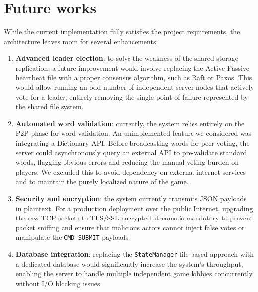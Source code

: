 \documentclass{scrartcl}
\begin{document}
\section{Future works}\label{future-works}
While the current implementation fully satisfies the project requirements, the architecture leaves room for several enhancements:
\begin{enumerate}
  \item \textbf{Advanced leader election}:
  to solve the weakness of the shared-storage replication, a future improvement would involve replacing the Active-Passive heartbeat file with a proper
  consensus algorithm, such as Raft or Paxos. This would allow running an odd number of independent server nodes that actively vote for a leader,
  entirely removing the single point of failure represented by the shared file system.
  \item \textbf{Automated word validation}:
  currently, the system relies entirely on the P2P phase for word validation. An unimplemented feature we considered was integrating a Dictionary API.
  Before broadcasting words for peer voting, the server could asynchronously query an external API to pre-validate standard words, flagging obvious errors and
  reducing the manual voting burden on players. We excluded this to avoid dependency on external internet services and to maintain the purely localized nature of the game.
  \item \textbf{Security and encryption}:
  the system currently transmits JSON payloads in plaintext. For a production deployment over the public Internet, upgrading the raw TCP sockets to
  TLS/SSL encrypted streams is mandatory to prevent packet sniffing and ensure that malicious actors cannot inject false votes or manipulate the
  \texttt{CMD\_SUBMIT} payloads.
  \item \textbf{Database integration}:
  replacing the \texttt{StateManager} file-based approach with a dedicated database would significantly increase the system's throughput, enabling the server
  to handle multiple independent game lobbies concurrently without I/O blocking issues.
\end{enumerate}
\end{document}
